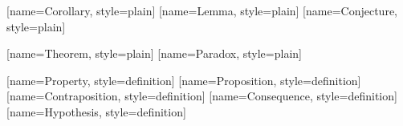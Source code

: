 		\DeclareCiteCommand{\fullciteBeamer}
		{}
		{%
			\setunit{\addperiod\space}%
		}
		{\multicitedelim}
		{}

		\DeclareCiteCommand{\nofullciteBeamer}
		{}
		{%
			\textsuperscript{\footnotesize{}}%
		}
		{\multicitedelim}
		{}




		\newcommand{\myListAddBib}[1]{  }
		\expandafter\forcsvlist\expandafter\myListAddBib\expandafter{\Pathbasebib}
		\expandafter\forcsvlist\expandafter\myListAddBib\expandafter{\PathbrefOtherbib}



		[name=Corollary, style=plain]
		[name=Lemma, style=plain]
		[name=Conjecture, style=plain]

		[name=Theorem, style=plain]
		[name=Paradox, style=plain]

		[name=Property, style=definition]
		[name=Proposition, style=definition]
		[name=Contraposition, style=definition]
		[name=Consequence, style=definition]
		[name=Hypothesis, style=definition]

